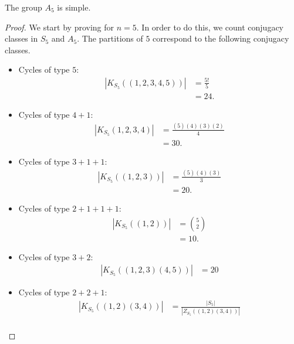 \documentclass[10pt]{mypackage}
\begin{document}
\begin{theorem}
  The group $A_5$ is simple.
\end{theorem}
\begin{proof}
  We start by proving for $n = 5$. In order to do this, we count conjugacy classes in $S_5$ and $A_5$. The partitions of $5$ correspond to the following conjugacy classes.
  \begin{itemize}
    \item Cycles of type $5$:
      \begin{align*}
        \left\vert K_{S_5}\left( \left( 1,2,3,4,5 \right) \right) \right\vert &= \frac{5!}{5}\\
                                                                              &= 24.
      \end{align*}
    \item Cycles of type $4+1$:
      \begin{align*}
        \left\vert K_{S_5}\left( 1,2,3,4 \right) \right\vert &= \frac{\left( 5 \right)\left( 4 \right)\left( 3 \right)\left( 2 \right)}{4}\\
                                                             &= 30.
      \end{align*}
    \item Cycles of type $3+1+1$:
      \begin{align*}
        \left\vert K_{S_5}\left( \left( 1,2,3 \right) \right) \right\vert &= \frac{\left( 5 \right)\left( 4 \right)\left( 3 \right)}{3}\\
                                                                          &= 20.
      \end{align*}
    \item Cycles of type $2+1+1+1$:
      \begin{align*}
        \left\vert K_{S_5}\left( \left( 1,2 \right) \right) \right\vert &= {5\choose 2}\\
                                                                        &= 10.
      \end{align*}
    \item Cycles of type $3+2$:
      \begin{align*}
        \left\vert K_{S_5}\left( \left( 1,2,3 \right)\left( 4,5 \right) \right) \right\vert &= 20
      \end{align*}
    \item Cycles of type $2+2+1$:
      \begin{align*}
        \left\vert K_{S_5}\left( \left( 1,2 \right)\left( 3,4 \right) \right) \right\vert &= \frac{\left\vert S_5 \right\vert}{\left\vert Z_{S_5}\left( \left( 1,2 \right)\left( 3,4 \right) \right) \right\vert}\\

\end{align*}
\end{itemize}
\end{proof}
\end{document}
